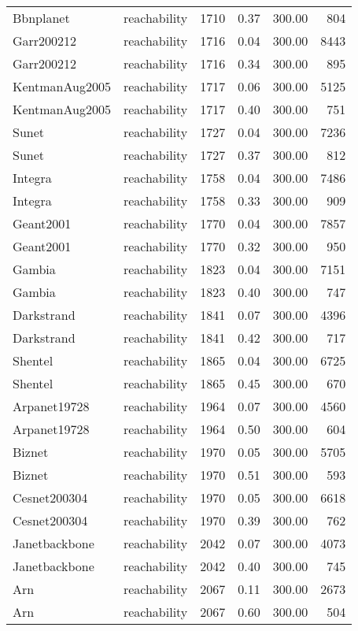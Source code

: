 \begin{tabular}{llrrrr}
Bbnplanet & reachability & 1710 & 0.37 & 300.00 & 804 \\
Garr200212 & reachability & 1716 & 0.04 & 300.00 & 8443 \\
Garr200212 & reachability & 1716 & 0.34 & 300.00 & 895 \\
KentmanAug2005 & reachability & 1717 & 0.06 & 300.00 & 5125 \\
KentmanAug2005 & reachability & 1717 & 0.40 & 300.00 & 751 \\
Sunet & reachability & 1727 & 0.04 & 300.00 & 7236 \\
Sunet & reachability & 1727 & 0.37 & 300.00 & 812 \\
Integra & reachability & 1758 & 0.04 & 300.00 & 7486 \\
Integra & reachability & 1758 & 0.33 & 300.00 & 909 \\
Geant2001 & reachability & 1770 & 0.04 & 300.00 & 7857 \\
Geant2001 & reachability & 1770 & 0.32 & 300.00 & 950 \\
Gambia & reachability & 1823 & 0.04 & 300.00 & 7151 \\
Gambia & reachability & 1823 & 0.40 & 300.00 & 747 \\
Darkstrand & reachability & 1841 & 0.07 & 300.00 & 4396 \\
Darkstrand & reachability & 1841 & 0.42 & 300.00 & 717 \\
Shentel & reachability & 1865 & 0.04 & 300.00 & 6725 \\
Shentel & reachability & 1865 & 0.45 & 300.00 & 670 \\
Arpanet19728 & reachability & 1964 & 0.07 & 300.00 & 4560 \\
Arpanet19728 & reachability & 1964 & 0.50 & 300.00 & 604 \\
Biznet & reachability & 1970 & 0.05 & 300.00 & 5705 \\
Biznet & reachability & 1970 & 0.51 & 300.00 & 593 \\
Cesnet200304 & reachability & 1970 & 0.05 & 300.00 & 6618 \\
Cesnet200304 & reachability & 1970 & 0.39 & 300.00 & 762 \\
Janetbackbone & reachability & 2042 & 0.07 & 300.00 & 4073 \\
Janetbackbone & reachability & 2042 & 0.40 & 300.00 & 745 \\
Arn & reachability & 2067 & 0.11 & 300.00 & 2673 \\
Arn & reachability & 2067 & 0.60 & 300.00 & 504 \\

\end{tabular}
